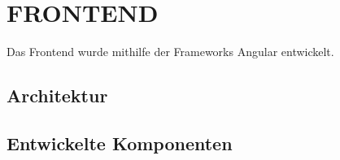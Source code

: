 \section{FRONTEND}\label{ch:frontend}

Das Frontend wurde mithilfe der Frameworks Angular entwickelt.

\subsection{Architektur}

\subsection{Entwickelte Komponenten}



